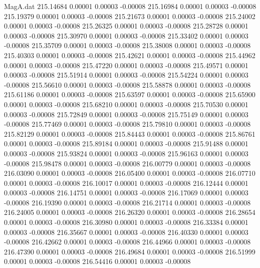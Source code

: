 \begin{filecontents}{MagA.dat}
 215.14684    0.00001    0.00003   -0.00008
 215.16984    0.00001    0.00003   -0.00008
 215.19379    0.00001    0.00003   -0.00008
 215.21673    0.00001    0.00003   -0.00008
 215.24002    0.00001    0.00003   -0.00008
 215.26325    0.00001    0.00003   -0.00008
 215.28728    0.00001    0.00003   -0.00008
 215.30970    0.00001    0.00003   -0.00008
 215.33402    0.00001    0.00003   -0.00008
 215.35709    0.00001    0.00003   -0.00008
 215.38008    0.00001    0.00003   -0.00008
 215.40303    0.00001    0.00003   -0.00008
 215.42621    0.00001    0.00003   -0.00008
 215.44962    0.00001    0.00003   -0.00008
 215.47220    0.00001    0.00003   -0.00008
 215.49571    0.00001    0.00003   -0.00008
 215.51914    0.00001    0.00003   -0.00008
 215.54224    0.00001    0.00003   -0.00008
 215.56610    0.00001    0.00003   -0.00008
 215.58878    0.00001    0.00003   -0.00008
 215.61186    0.00001    0.00003   -0.00008
 215.63597    0.00001    0.00003   -0.00008
 215.65900    0.00001    0.00003   -0.00008
 215.68210    0.00001    0.00003   -0.00008
 215.70530    0.00001    0.00003   -0.00008
 215.72849    0.00001    0.00003   -0.00008
 215.75149    0.00001    0.00003   -0.00008
 215.77469    0.00001    0.00003   -0.00008
 215.79810    0.00001    0.00003   -0.00008
 215.82129    0.00001    0.00003   -0.00008
 215.84443    0.00001    0.00003   -0.00008
 215.86761    0.00001    0.00003   -0.00008
 215.89184    0.00001    0.00003   -0.00008
 215.91488    0.00001    0.00003   -0.00008
 215.93824    0.00001    0.00003   -0.00008
 215.96163    0.00001    0.00003   -0.00008
 215.98478    0.00001    0.00003   -0.00008
 216.00779    0.00001    0.00003   -0.00008
 216.03090    0.00001    0.00003   -0.00008
 216.05400    0.00001    0.00003   -0.00008
 216.07710    0.00001    0.00003   -0.00008
 216.10017    0.00001    0.00003   -0.00008
 216.12444    0.00001    0.00003   -0.00008
 216.14751    0.00001    0.00003   -0.00008
 216.17069    0.00001    0.00003   -0.00008
 216.19390    0.00001    0.00003   -0.00008
 216.21714    0.00001    0.00003   -0.00008
 216.24005    0.00001    0.00003   -0.00008
 216.26320    0.00001    0.00003   -0.00008
 216.28654    0.00001    0.00003   -0.00008
 216.30980    0.00001    0.00003   -0.00008
 216.33384    0.00001    0.00003   -0.00008
 216.35667    0.00001    0.00003   -0.00008
 216.40330    0.00001    0.00003   -0.00008
 216.42662    0.00001    0.00003   -0.00008
 216.44966    0.00001    0.00003   -0.00008
 216.47390    0.00001    0.00003   -0.00008
 216.49684    0.00001    0.00003   -0.00008
 216.51999    0.00001    0.00003   -0.00008
 216.54416    0.00001    0.00003   -0.00008

\end{filecontents}
